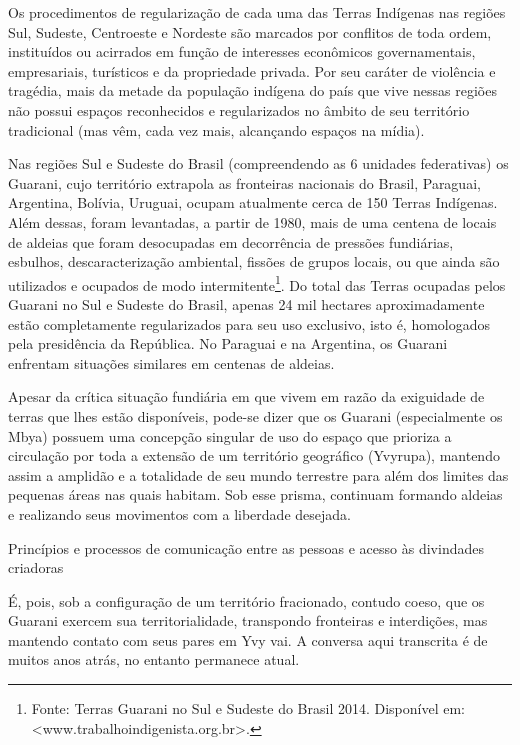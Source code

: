 \documentclass{article}
\begin{document}
Os procedimentos de regulariza\c{c}\~ao de cada uma das Terras
Ind\'igenas nas regi\~oes Sul, Sudeste, Centroeste e Nordeste s\~ao
marcados por conflitos de toda ordem, institu\'idos ou acirrados em
fun\c{c}\~ao de interesses econ\^omicos governamentais, empresariais,
tur\'isticos e da propriedade privada. Por seu car\'ater de viol\^encia
e trag\'edia, mais da metade da popula\c{c}\~ao ind\'igena do pa\'is
que vive nessas regi\~oes n\~ao possui espa\c{c}os reconhecidos e
regularizados no \^ambito de seu territ\'orio tradicional (mas v\^em,
cada vez mais, alcan\c{c}ando espa\c{c}os na m\'idia). 

Nas regi\~oes Sul e Sudeste do Brasil (compreendendo as 6 unidades
federativas) os Guarani, cujo territ\'orio extrapola as fronteiras
nacionais do Brasil, Paraguai, Argentina, Bol\'ivia, Uruguai, ocupam
atualmente cerca de 150 Terras Ind\'igenas. Al\'em dessas, foram
levantadas, a partir de 1980, mais de uma centena de locais de aldeias
que foram desocupadas em decorr\^encia de press\~oes fundi\'arias,
esbulhos, descaracteriza\c{c}\~ao ambiental, fiss\~oes de grupos
locais, ou que ainda s\~ao utilizados e ocupados de modo
intermitente\footnote{ Fonte: Terras Guarani no Sul e Sudeste do Brasil
2014. Dispon\'ivel em:
{\textless}www.trabalhoindigenista.org.br{\textgreater}.}. Do total das
Terras ocupadas pelos Guarani no Sul e Sudeste do Brasil, apenas 24 mil
hectares aproximadamente est\~ao completamente regularizados para seu
uso exclusivo, isto \'e, homologados pela presid\^encia da Rep\'ublica.
No Paraguai e na Argentina, os Guarani enfrentam situa\c{c}\~oes
similares em centenas de aldeias. 

Apesar da cr\'itica situa\c{c}\~ao fundi\'aria em que vivem em raz\~ao
da exiguidade de terras que lhes est\~ao dispon\'iveis, pode-se dizer
que os Guarani (especialmente os Mbya) possuem uma concep\c{c}\~ao
singular de uso do espa\c{c}o que prioriza a circula\c{c}\~ao por toda
a extens\~ao de um territ\'orio geogr\'afico (Yvyrupa), mantendo assim
a amplid\~ao e a totalidade de seu mundo terrestre para al\'em dos
limites das pequenas \'areas nas quais habitam. Sob esse prisma,
continuam formando aldeias e realizando seus movimentos com a liberdade
desejada.  

Princ\'ipios e processos de comunica\c{c}\~ao entre as pessoas e acesso
\`as divindades criadoras 

\'E, pois, sob a configura\c{c}\~ao de um territ\'orio fracionado,
contudo coeso, que os Guarani exercem sua territorialidade, transpondo
fronteiras e interdi\c{c}\~oes, mas mantendo contato com seus pares em
Yvy vai. A conversa aqui transcrita \'e de muitos anos atr\'as, no
entanto permanece atual. 
\end{document}
